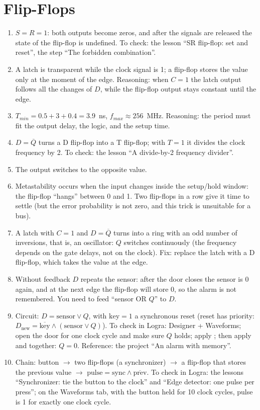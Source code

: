 \section*{Flip-Flops}
\begin{enumerate}
  \item {} $S=R=1$: both outputs become zeros, and after the signals are released the state of the flip-flop is undefined. To check: the lesson ``SR flip-flop: set and reset'', the step ``The forbidden combination''.
  \item {} A latch is transparent while the clock signal is 1; a flip-flop stores the value only at the moment of the edge. Reasoning: when $C=1$ the latch output follows all the changes of $D$, while the flip-flop output stays constant until the edge.
  \item {} $T_{min}=0.5+3+0.4=3.9$~ns, $f_{max}\approx 256$~MHz. Reasoning: the period must fit the output delay, the logic, and the setup time.
  \item {} $D=\overline{Q}$ turns a D flip-flop into a T flip-flop; with $T=1$ it divides the clock frequency by 2. To check: the lesson ``A divide-by-2 frequency divider''.
  \item {} The output switches to the opposite value.
  \item {} Metastability occurs when the input changes inside the setup/hold window: the flip-flop ``hangs'' between 0 and 1. Two flip-flops in a row give it time to settle (but the error probability is not zero, and this trick is unsuitable for a bus).
  \item {} A latch with $C=1$ and $D=\overline{Q}$ turns into a ring with an odd number of inversions, that is, an oscillator: $Q$ switches continuously (the frequency depends on the gate delays, not on the clock). Fix: replace the latch with a D flip-flop, which takes the value at the edge.
  \item {} Without feedback $D$ repeats the sensor: after the door closes the sensor is 0 again, and at the next edge the flip-flop will store 0, so the alarm is not remembered. You need to feed ``sensor OR $Q$'' to $D$.
  \item {} Circuit: $D=\text{sensor}\lor Q$, with $\text{key}=1$ a synchronous reset (reset has priority: $D_{\text{new}}=\overline{\text{key}}\land(\text{sensor}\lor Q)$). To check in Logra: Designer + Waveforms; open the door for one clock cycle and make sure $Q$ holds; apply ; then apply  and  together: $Q=0$. Reference: the project ``An alarm with memory''.
  \item {} Chain: button $\to$ two flip-flops (a synchronizer) $\to$ a flip-flop that stores the previous value $\to$ $\text{pulse}=\text{sync}\land\overline{\text{prev}}$. To check in Logra: the lessons ``Synchronizer: tie the button to the clock'' and ``Edge detector: one pulse per press''; on the Waveforms tab, with the button held for 10 clock cycles, pulse is 1 for exactly one clock cycle.
\end{enumerate}

